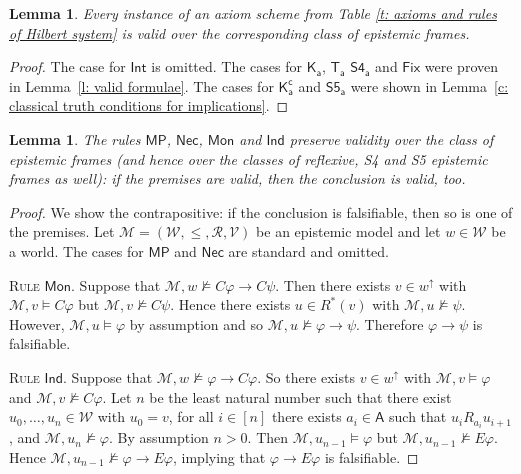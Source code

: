 \documentclass{myifcolog}
\newcommand\C {C}
\newcommand{\K}{K}
\newcommand\A{\mathsf{A}}
\newcommand{\agi}{a}
\newcommand{\E}{E}
\newcommand{\fw}{\mathcal{M}}
\newcommand{\W}{\mathcal{W}}
\newcommand{\rel}{\mathcal{R}}
\newcommand{\V}{\mathcal{V}}
\newtheorem{lemma}[theorem]{Lemma}
\numberwithin{theorem}{section}
\begin{document}
\begin{lemma}\label{l: axioms of ICK are valid}
    Every instance of an axiom scheme from Table \ref{t: axioms and rules of Hilbert system} is valid over the corresponding class of epistemic frames.
\end{lemma}
\begin{proof}
    The case for $\mathsf{Int}$ is omitted. The cases for $\mathsf{K_\agi}$, $\mathsf{T_\agi}$ $\mathsf{S4_\agi}$ and $\mathsf{Fix}$ were proven in Lemma~\ref{l: valid formulae}. The cases for $\mathsf{\K_\agi^c}$ and $\mathsf{S5_\agi}$ were shown in Lemma~\ref{c: classical truth conditions for implications}.
\end{proof}

\begin{lemma}\label{l: rules are valid}
    The rules $\mathsf{MP}$, $\mathsf{Nec}$, $\mathsf{Mon}$ and $\mathsf{Ind}$ preserve validity over the class of epistemic frames (and hence over the classes of reflexive, S4 and S5 epistemic frames as well): if the premises are valid, then the conclusion is valid, too.
\end{lemma}
\begin{proof}
 We show the contrapositive: if the conclusion is falsifiable, then so is one of the premises. Let $\fw=(\W, \leq, \rel, \V)$ be an epistemic model and let $w \in \W$ be a world. The cases for $\mathsf{MP}$ and $\mathsf{Nec}$ are standard and omitted. \smallskip
 
 
 \noindent \textsc{Rule $\mathsf{Mon}$.} Suppose that $\fw,w \not \models \C \varphi \rightarrow \C \psi$. Then there exists $v \in w^\uparrow$ with $\fw,v \models \C \varphi$ but $\fw,v \not \models \C \psi$. Hence there exists $u \in R^*(v)$ with $\fw,u \not \models \psi$. However, $\fw,u \models \varphi$ by assumption and so $\fw,u \not \models \varphi \rightarrow \psi$. Therefore $\varphi \rightarrow \psi$ is falsifiable. \smallskip
 
 \noindent \textsc{Rule $\mathsf{Ind}$.} Suppose that $\fw,w \not \models \varphi \rightarrow \C \varphi$. So there exists $v \in w^\uparrow$ with $\fw, v \models \varphi$ and $\fw, v \not \models \C \varphi$. Let $n$ be the least natural number such that there exist $u_0, \ldots, u_n \in \W$ with $u_0 = v$, for all $i \in [n]$ there exists $\agi_i \in \A$ such that $u_i \mathrel{R_{\agi_i}} u_{i+1}$, and $\fw, u_n \not \models \varphi$. By assumption $n > 0$. Then $\fw, u_{n-1} \models \varphi$ but $\fw, u_{n-1} \not \models \E \varphi$. Hence $\fw, u_{n-1} \not \models \varphi \rightarrow \E \varphi$, implying that $\varphi \rightarrow \E \varphi$ is falsifiable.
\end{proof}
\end{document}
